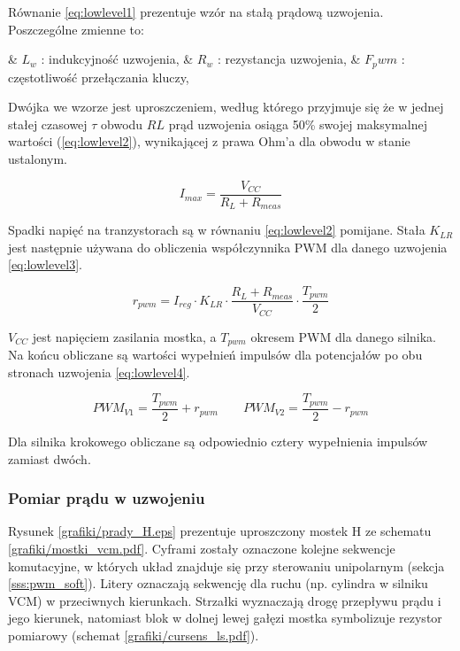 Równanie \ref{eq:lowlevel1} prezentuje wzór na stałą prądową uzwojenia. Poszczególne zmienne to:

\begin{easylist}
	& $ L_w $ : indukcyjność uzwojenia,
	& $ R_w $ : rezystancja uzwojenia,
	& $ F_pwm $ : częstotliwość przełączania kluczy,
	\\
\end{easylist} 

Dwójka we wzorze jest uproszczeniem, według którego przyjmuje się że w jednej stałej czasowej $ \tau $ obwodu $ RL $  prąd uzwojenia osiąga 50\% swojej maksymalnej wartości (\ref{eq:lowlevel2}), wynikającej z prawa Ohm'a dla obwodu w stanie ustalonym.

\begin{equation} \label{eq:lowlevel2}
	I_{max} = \frac{V_{CC}}{R_L + R_{meas}}
\end{equation}

Spadki napięć na tranzystorach są w równaniu \ref{eq:lowlevel2} pomijane. Stała $ K_{LR} $ jest następnie używana do obliczenia współczynnika PWM dla danego uzwojenia \ref{eq:lowlevel3}.

\begin{equation} \label{eq:lowlevel3}
	r_{pwm} = I_{reg} \cdot K_{LR} \cdot \frac{R_L + R_{meas}}{V_{CC}} \cdot \frac{T_{pwm}}{2}
\end{equation}

$ V_{CC} $ jest napięciem zasilania mostka, a $ T_{pwm} $ okresem PWM dla danego silnika. Na końcu obliczane są wartości wypełnień impulsów dla potencjałów po obu stronach uzwojenia \ref{eq:lowlevel4}.

\begin{equation} \label{eq:lowlevel4}
	PWM_{V1} = \frac{T_{pwm}}{2} + r_{pwm} 	\qquad 	PWM_{V2} = \frac{T_{pwm}}{2} - r_{pwm}
\end{equation}

Dla silnika krokowego obliczane są odpowiednio cztery wypełnienia impulsów zamiast dwóch.

\subsubsection{Pomiar prądu w uzwojeniu}

Rysunek \ref{grafiki/prady_H.eps} prezentuje uproszczony mostek H ze schematu \ref{grafiki/mostki_vcm.pdf}. Cyframi zostały oznaczone kolejne sekwencje komutacyjne, w których układ znajduje się przy sterowaniu unipolarnym (sekcja \ref{sss:pwm_soft}). Litery oznaczają sekwencję dla ruchu (np. cylindra w silniku VCM) w przeciwnych kierunkach. Strzałki wyznaczają drogę przepływu prądu i jego kierunek, natomiast blok w dolnej lewej gałęzi mostka symbolizuje rezystor pomiarowy (schemat \ref{grafiki/cursens_ls.pdf}). 

